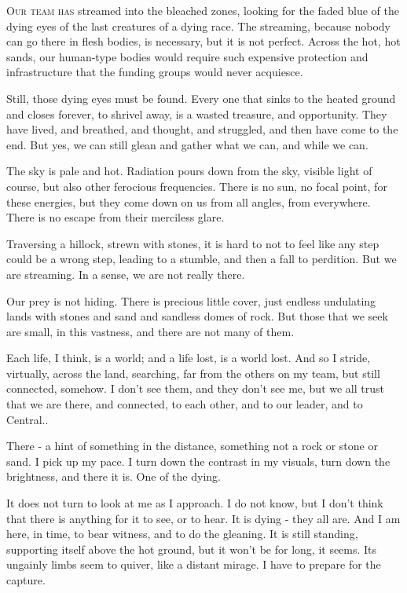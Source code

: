 
\lettrine{O}{ur team has} streamed into the bleached zones, looking for the faded
blue of the dying eyes of the last creatures of a dying race. The
streaming, because nobody can go there in flesh bodies, is necessary,
but it is not perfect. Across the hot, hot sands, our human-type bodies
would require such expensive protection and infrastructure that the
funding groups would never acquiesce.

Still, those dying eyes must be found. Every one that sinks to the
heated ground and closes forever, to shrivel away, is a wasted treasure,
and opportunity. They have lived, and breathed, and thought, and
struggled, and then have come to the end. But yes, we can still glean
and gather what we can, and while we can.

The sky is pale and hot. Radiation pours down from the sky, visible
light of course, but also other ferocious frequencies. There is no sun,
no focal point, for these energies, but they come down on us from all
angles, from everywhere. There is no escape from their merciless glare.

Traversing a hillock, strewn with stones, it is hard to not to feel like
any step could be a wrong step, leading to a stumble, and then a fall to
perdition. But we are streaming. In a sense, we are not really there.

Our prey is not hiding. There is precious little cover, just endless
undulating lands with stones and sand and sandless domes of rock. But
those that we seek are small, in this vastness, and there are not many
of them.

Each life, I think, is a world; and a life lost, is a world lost. And so
I stride, virtually, across the land, searching, far from the others on
my team, but still connected, somehow. I don't see them, and they don't
see me, but we all trust that we are there, and connected, to each
other, and to our leader, and to Central..

There - a hint of something in the distance, something not a rock or
stone or sand. I pick up my pace. I turn down the contrast in my
visuals, turn down the brightness, and there it is. One of the dying.

It does not turn to look at me as I approach. I do not know, but I don't
think that there is anything for it to see, or to hear. It is dying -
they all are. And I am here, in time, to bear witness, and to do the
gleaning. It is still standing, supporting itself above the hot ground,
but it won't be for long, it seems. Its ungainly limbs seem to quiver,
like a distant mirage. I have to prepare for the capture.

